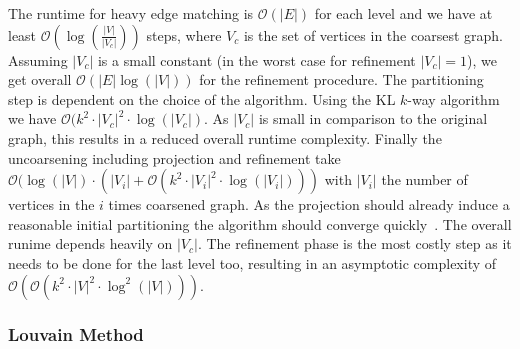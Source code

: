                 The runtime for heavy edge matching is $\mathcal{O}(|E|)$ for each level and we have at least $\mathcal{O}(\log(\frac{|V|}{|V_c|}))$ steps, where $V_c$ is the set of vertices in the coarsest graph. 
                Assuming $|V_c|$ is a small constant (in the worst case for refinement $|V_c| = 1$), we get overall $\mathcal{O}(|E| \log(|V|))$ for the refinement procedure.
                The partitioning step is dependent on the choice of the algorithm.
                Using the KL $k$-way algorithm we have  $\mathcal{O}(k^2 \cdot |V_c|^2 \cdot \log(|V_c|)$. As $|V_c|$ is small in comparison to the original graph, this results in a reduced overall runtime complexity.
                Finally the uncoarsening including projection and refinement take $\mathcal{O}(\log(|V|) \cdot (|V_i| + \mathcal{O}(k^2 \cdot |V_i|^2 \cdot \log(|V_i|)))$ with $|V_i|$ the number of vertices in the $i$ times coarsened graph.  
                As the projection should already induce a reasonable initial partitioning the algorithm should converge quickly~\autocite{hendrickson1995multi}.
                The overall runime depends heavily on $|V_c|$. 
                The refinement phase is the most costly step as it needs to be done for the last level too, resulting in an asymptotic complexity of $\mathcal{O}(\mathcal{O}(k^2 \cdot |V|^2 \cdot \log^2(|V|)))$.
                

            \subsubsection*{Louvain Method}

 

